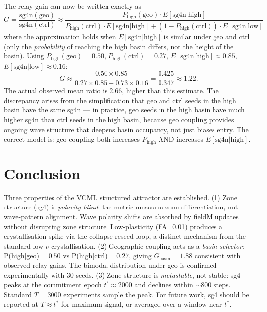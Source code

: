 \documentclass[11pt]{article}
\begin{document}
The relay gain can now be written exactly as
\begin{equation}
  G = \frac{\mathrm{sg4n(geo)}}{\mathrm{sg4n(ctrl)}}
    \approx \frac{P_\mathrm{high}(\mathrm{geo}) \cdot E[\mathrm{sg4n}|\mathrm{high}]}
               {P_\mathrm{high}(\mathrm{ctrl}) \cdot E[\mathrm{sg4n}|\mathrm{high}] +
                (1-P_\mathrm{high}(\mathrm{ctrl})) \cdot E[\mathrm{sg4n}|\mathrm{low}]}
\end{equation}
where the approximation holds when $E[\mathrm{sg4n}|\mathrm{high}]$ is
similar under geo and ctrl (only the \emph{probability} of reaching the
high basin differs, not the height of the basin).
Using $P_\mathrm{high}(\mathrm{geo})=0.50$, $P_\mathrm{high}(\mathrm{ctrl})=0.27$,
$E[\mathrm{sg4n}|\mathrm{high}] \approx 0.85$, $E[\mathrm{sg4n}|\mathrm{low}] \approx 0.16$:
\begin{equation}
  G \approx \frac{0.50 \times 0.85}{0.27 \times 0.85 + 0.73 \times 0.16}
           = \frac{0.425}{0.347} \approx 1.22.
\end{equation}
The actual observed mean ratio is 2.66, higher than this estimate.
The discrepancy arises from the simplification that geo and ctrl seeds in the
high basin have the same sg4n --- in practice, geo seeds in the high basin
have much higher sg4n than ctrl seeds in the high basin, because geo coupling
provides ongoing wave structure that deepens basin occupancy, not just biases entry.
The correct model is: geo coupling both increases $P_\mathrm{high}$ AND
increases $E[\mathrm{sg4n}|\mathrm{high}]$.

\section{Conclusion}

Three properties of the VCML structured attractor are established.
(1) Zone structure (sg4) is \emph{polarity-blind}: the metric measures
zone differentiation, not wave-pattern alignment.
Wave polarity shifts are absorbed by fieldM updates without disrupting zone
structure.
Low-plasticity (FA=0.01) produces a crystallisation spike via the
collapse-reseed loop, a distinct mechanism from the standard low-$\nu$
crystallisation.
(2) Geographic coupling acts as a \emph{basin selector}: P(high$|$geo)$=0.50$
vs P(high$|$ctrl)$=0.27$, giving $G_\mathrm{basin}=1.88$ consistent with
observed relay gains.
The bimodal distribution under geo is confirmed experimentally with 30 seeds.
(3) Zone structure is \emph{metastable}, not stable: sg4 peaks at the
commitment epoch $t^*\approx 2000$ and declines within $\sim 800$ steps.
Standard $T=3000$ experiments sample the peak.
For future work, sg4 should be reported at $T\approx t^*$ for maximum signal,
or averaged over a window near $t^*$.
\end{document}
